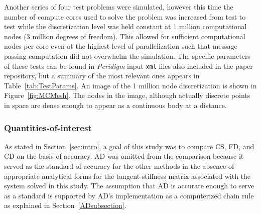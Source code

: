 \documentclass[preprint,12pt]{elsarticle}
\begin{document}
Another series of four test problems were simulated, however this time the number of compute cores used to solve the problem was increased from test to test while the discretization level was held constant at 1 million computational nodes (3 million degrees of freedom). This allowed for sufficient computational nodes per core even at the highest level of parallelization such that message passing computation did not overwhelm the simulation.  The specific parameters of these tests can be found in \emph{Peridigm} input {\tt xml} files also included in the paper repository, but a summary of the most relevant ones appears in Table~\ref{tab:TestParams}. An image of the 1 million node discretization is shown in Figure~\ref{fig:MCMesh}. The nodes in the image, although actually discrete points in space are dense enough to appear as a continuous body at a distance.

\subsubsection{Quantities-of-interest} 
\label{JGAM} 

As stated in Section~\ref{sec:intro}, a goal of this study was to compare CS, FD, and CD on the basis of accuracy. AD was omitted from the comparison because it served as the standard of accuracy for the other methods in the absence of appropriate analytical forms for the tangent-stiffness matrix associated with the system solved in this study. The assumption that AD is accurate enough to serve as a standard is supported by AD's implementation as a computerized chain rule as explained in Section~\ref{ADsubsection}.
\end{document}

